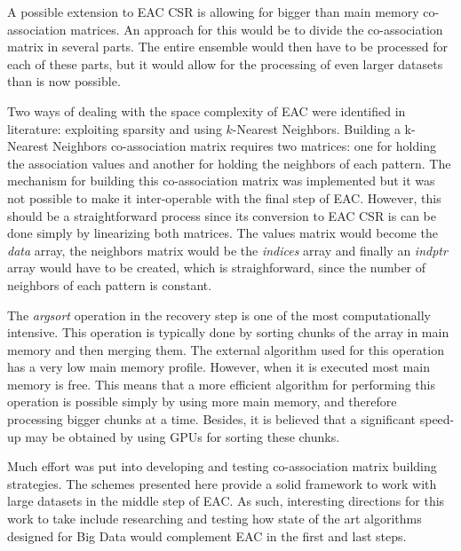 A possible extension to EAC CSR is allowing for bigger than main memory co-association matrices.
An approach for this would be to divide the co-association matrix in several parts.
The entire ensemble would then have to be processed for each of these parts, but it would allow for the processing of even larger datasets than is now possible.

Two ways of dealing with the space complexity of EAC were identified in literature: exploiting sparsity and using $k$-Nearest Neighbors.
Building a k-Nearest Neighbors co-association matrix requires two matrices: one for holding the association values and another for holding the neighbors of each pattern.
The mechanism for building this co-association matrix was implemented but it was not possible to make it inter-operable with the final step of EAC.
However, this should be a straightforward process since its conversion to EAC CSR is can be done simply by linearizing both matrices.
The values matrix would become the \emph{data} array, the neighbors matrix would be the \emph{indices} array and finally an \emph{indptr} array would have to be created, which is straighforward, since the number of neighbors of each pattern is constant.


The \emph{argsort} operation in the recovery step is one of the most computationally intensive.
This operation is typically done by sorting chunks of the array in main memory and then merging them.
The external algorithm used for this operation has a very low main memory profile.
However, when it is executed most main memory is free.
This means that a more efficient algorithm for performing this operation is possible simply by using more main memory, and therefore processing bigger chunks at a time.
Besides, it is believed that a significant speed-up may be obtained by using GPUs for sorting these chunks.

Much effort was put into developing and testing co-association matrix building strategies.
The schemes presented here provide a solid framework to work with large datasets in the middle step of EAC.
As such, interesting directions for this work to take include researching and testing how state of the art algorithms designed for Big Data would complement EAC in the first and last steps.

\cleardoublepage

